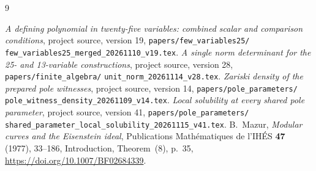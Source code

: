 \documentclass[11pt,a4paper]{article}
\theoremstyle{remark}\newtheorem{remark}[theorem]{Remark}
\begin{document}
\begin{thebibliography}{9}
\raggedright
{}
\emph{A defining polynomial in twenty-five variables:
combined scalar and comparison conditions},
project source, version 19,
\texttt{papers/few\_variables25/}\allowbreak
\texttt{few\_variables25\_merged\_20261110\_v19.tex}.
\emph{A single norm determinant for the 25- and 13-variable constructions},
project source, version 28,
\texttt{papers/finite\_algebra/}\allowbreak
\texttt{unit\_norm\_20261114\_v28.tex}.
\emph{Zariski density of the prepared pole witnesses},
project source, version 14,
\texttt{papers/pole\_parameters/}\allowbreak
\texttt{pole\_witness\_density\_20261109\_v14.tex}.
\emph{Local solubility at every shared pole parameter},
project source, version 41,
\texttt{papers/pole\_parameters/}\allowbreak
\texttt{shared\_parameter\_local\_solubility\_20261115\_v41.tex}.
B.~Mazur, \emph{Modular curves and the Eisenstein ideal},
Publications Math\'ematiques de l'IH\'ES \textbf{47} (1977), 33--186,
Introduction, Theorem~(8), p.~35,
\url{https://doi.org/10.1007/BF02684339}.
\end{thebibliography}
\end{document}
